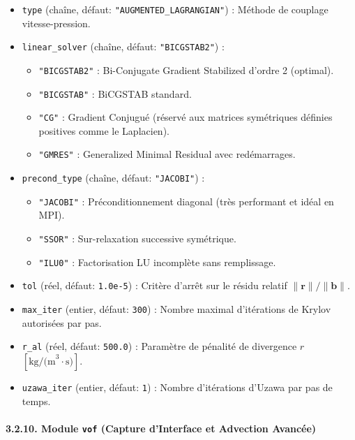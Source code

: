 \documentclass[
  french,
]{article}
\providecommand{\tightlist}{%
  \setlength{\itemsep}{0pt}\setlength{\parskip}{0pt}}
\begin{document}
\begin{itemize}
\tightlist
\item
  \texttt{type} (chaîne, défaut: \texttt{"AUGMENTED\_LAGRANGIAN"}) :
  Méthode de couplage vitesse-pression.
\item
  \texttt{linear\_solver} (chaîne, défaut: \texttt{"BICGSTAB2"}) :

  \begin{itemize}
  \tightlist
  \item
    \texttt{"BICGSTAB2"} : Bi-Conjugate Gradient Stabilized d'ordre 2
    (optimal).
  \item
    \texttt{"BICGSTAB"} : BiCGSTAB standard.
  \item
    \texttt{"CG"} : Gradient Conjugué (réservé aux matrices symétriques
    définies positives comme le Laplacien).
  \item
    \texttt{"GMRES"} : Generalized Minimal Residual avec redémarrages.
  \end{itemize}
\item
  \texttt{precond\_type} (chaîne, défaut: \texttt{"JACOBI"}) :

  \begin{itemize}
  \tightlist
  \item
    \texttt{"JACOBI"} : Préconditionnement diagonal (très performant et
    idéal en MPI).
  \item
    \texttt{"SSOR"} : Sur-relaxation successive symétrique.
  \item
    \texttt{"ILU0"} : Factorisation LU incomplète sans remplissage.
  \end{itemize}
\item
  \texttt{tol} (réel, défaut: \texttt{1.0e-5}) : Critère d'arrêt sur le
  résidu relatif \(\|\mathbf{r}\| / \|\mathbf{b}\|\).
\item
  \texttt{max\_iter} (entier, défaut: \texttt{300}) : Nombre maximal
  d'itérations de Krylov autorisées par pas.
\item
  \texttt{r\_al} (réel, défaut: \texttt{500.0}) : Paramètre de pénalité
  de divergence \(r\) \([\text{kg/(m}^3\cdot\text{s)}]\).
\item
  \texttt{uzawa\_iter} (entier, défaut: \texttt{1}) : Nombre
  d'itérations d'Uzawa par pas de temps.
\end{itemize}

\paragraph{\texorpdfstring{3.2.10. Module \texttt{vof} (Capture
d'Interface et Advection
Avancée)}{3.2.10. Module vof (Capture d'Interface et Advection Avancée)}}\label{module-vof-capture-dinterface-et-advection-avancuxe9e}
\end{document}
